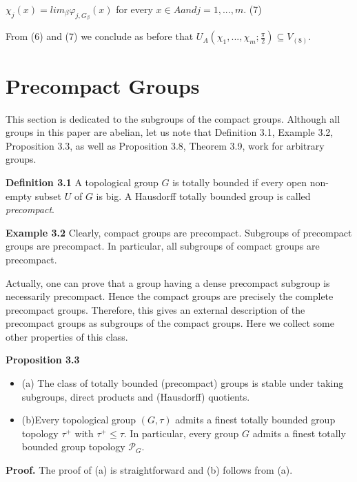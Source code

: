 \documentclass[12pt]{article}
\begin{document}
    
        $\chi_j(x) = lim_\beta \varphi_{j,G_\beta} (x)$ for every $x \in A and j = 1,...,m.$  (7)


    From (6) and (7) we conclude as before that $U_A(\chi_1,...,\chi_m; \frac{\pi}{2} ) \subseteq V_{(8)}$.


\section{Precompact Groups}


        This section is dedicated to the subgroups of the compact groups. Although all groups in this paper are abelian, let us
    note that Definition 3.1, Example 3.2, Proposition 3.3, as well as Proposition 3.8, Theorem 3.9, work for arbitrary groups.


    \textbf{Definition 3.1} A topological group $G$ is totally bounded if every open non-empty subset $U$ of $G$ is big. A Hausdorff totally
    bounded group is called \emph{precompact}.


    \textbf{Example 3.2} Clearly, compact groups are precompact. Subgroups of precompact groups are precompact. In particular, all
    subgroups of compact groups are precompact.


        Actually, one can prove that a group having a dense precompact subgroup is necessarily precompact. Hence the compact
    groups are precisely the complete precompact groups. Therefore, this gives an external description of the precompact groups
    as subgroups of the compact groups. Here we collect some other properties of this class.
    
    
    \textbf{Proposition 3.3}
        \begin{itemize}

            \item (a) The class of totally bounded (precompact) groups is stable under taking subgroups, direct products and (Hausdorff) quotients.
            
            \item (b)Every topological group $(G, \tau)$ admits a finest totally bounded group topology $\tau^+$ with $\tau^+ \leqslant \tau$. In particular, every group $G$
            admits a finest totally bounded group topology $\mathcal{P}_G$.

        \end{itemize}


\textbf{Proof.} The proof of (a) is straightforward and (b) follows from (a).
\end{document}
